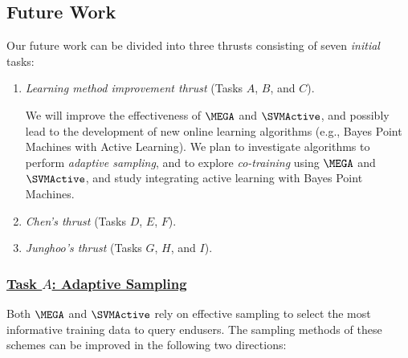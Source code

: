 \subsection{Future Work}
\label{sec-future-work}

Our future work 
can be divided into three thrusts consisting
of seven {\em initial} tasks:
\begin{enumerate}
\item {\em Learning method improvement thrust} (Tasks $A$, $B$, and $C$).

We will improve the effectiveness of
$\MEGA$ and $\SVMActive$, and possibly lead to
the development of new online learning algorithms
(e.g., Bayes Point Machines with Active Learning). We plan to 
investigate algorithms to perform {\em adaptive sampling}, and
to explore {\em co-training} using $\MEGA$ and $\SVMActive$,
and study integrating active learning with
Bayes Point Machines. 

\item {\em Chen's thrust} (Tasks $D$, $E$, $F$).



\item {\em Junghoo's thrust} (Tasks $G$, $H$, and $I$).
\end{enumerate}

\subsubsection*{\underline{Task $A$: Adaptive Sampling}}

Both $\MEGA$ and $\SVMActive$ rely on effective sampling 
to select the most informative training data to query endusers.
The sampling methods of these schemes can be
improved in the following two directions:

